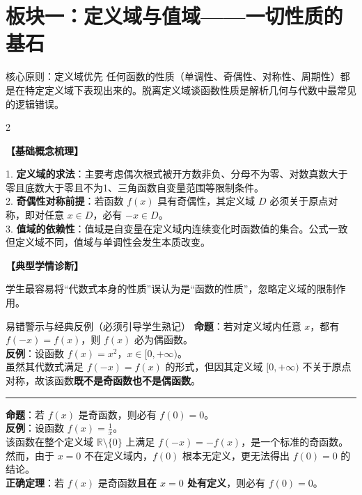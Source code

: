 \documentclass[11pt,a4paper]{ctexart}
\newcommand{\topicteachblock}[2]{%
  \par\addvspace{0.55em}%
  \noindent\textbf{【#1】}\par\nobreak
  \begingroup
    \setlength{\parskip}{0.35em}%
    #2\par
  \endgroup
}
\begin{document}
\newpage

\section{板块一：定义域与值域——一切性质的基石}

\begin{theorembox}{核心原则：定义域优先}
  任何函数的性质（单调性、奇偶性、对称性、周期性）都是在特定定义域下表现出来的。脱离定义域谈函数性质是解析几何与代数中最常见的逻辑错误。
\end{theorembox}

\begin{paracol}{2}
\topicteachblock{基础概念梳理}{
  1. \textbf{定义域的求法}：主要考虑偶次根式被开方数非负、分母不为零、对数真数大于零且底数大于零且不为1、三角函数自变量范围等限制条件。\\
  2. \textbf{奇偶性对称前提}：若函数 $f(x)$ 具有奇偶性，其定义域 $D$ 必须关于原点对称，即对任意 $x \in D$，必有 $-x \in D$。\\
  3. \textbf{值域的依赖性}：值域是自变量在定义域内连续变化时函数值的集合。公式一致但定义域不同，值域与单调性会发生本质改变。
}

\switchcolumn
\topicteachblock{典型学情诊断}{
  学生最容易将“代数式本身的性质”误认为是“函数的性质”，忽略定义域的限制作用。
}
\end{paracol}

\begin{warnbox}{易错警示与经典反例（必须引导学生熟记）}
  \textbf{命题}：若对定义域内任意 $x$，都有 $f(-x) = f(x)$，则 $f(x)$ 必为偶函数。\\
  \textbf{反例}：设函数 $f(x) = x^2$，$x \in [0, +\infty)$。\\
  虽然其代数式满足 $f(-x) = f(x)$ 的形式，但因其定义域 $[0, +\infty)$ 不关于原点对称，故该函数\textbf{既不是奇函数也不是偶函数}。
  \vspace{0.4em}
  \hrule
  \vspace{0.4em}
  \textbf{命题}：若 $f(x)$ 是奇函数，则必有 $f(0) = 0$。\\
  \textbf{反例}：设函数 $f(x) = \frac{1}{x}$。\\
  该函数在整个定义域 $\mathbb{R} \setminus \{0\}$ 上满足 $f(-x) = -f(x)$，是一个标准的奇函数。然而，由于 $x = 0$ 不在定义域内，$f(0)$ 根本无定义，更无法得出 $f(0)=0$ 的结论。\\
  \textbf{正确定理}：若 $f(x)$ 是奇函数\textbf{且在 $x = 0$ 处有定义}，则必有 $f(0) = 0$。
\end{warnbox}
\end{document}
